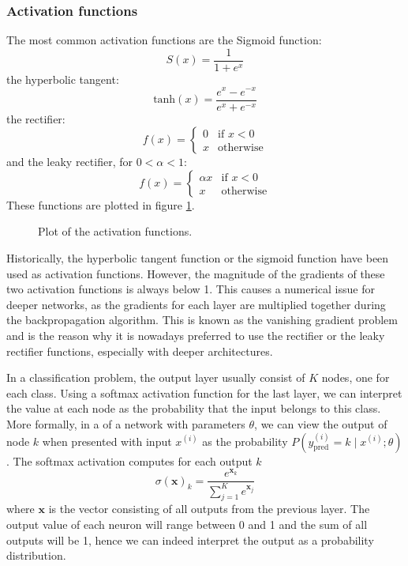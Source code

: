 \documentclass[12pt,a4paper,twoside,openright]{report}
\newlength\figureheight
\newlength\figurewidth
\begin{document}
\subsubsection{Activation functions}
The most common activation functions are the Sigmoid function:
\begin{equation}
S(x) = \frac{1}{1 + e^x}
\end{equation}
the hyperbolic tangent:
\begin{equation}
	\textrm{tanh}(x)=\frac{e^x - e^{-x}}{e^x + e^{-x}}
\end{equation}
the rectifier:
\begin{equation}
\label{eq:linear_rectifier}
	f(x) = 
\begin{cases}
	0 & \text{if } x < 0\\
	x & \text{otherwise}
\end{cases}
\end{equation}
and the leaky rectifier, for $0 < \alpha < 1$:
\begin{equation}
f(x) = 
\begin{cases}
	\alpha x & \text{if } x < 0\\
	x & \text{otherwise}
\end{cases}
\end{equation}
These functions are plotted in figure \ref{fig:activation_functions}. 
\begin{figure}
	\centering 
	\setlength\figureheight{10cm}
	\setlength{}
	
	\caption{Plot of the activation functions.}
	\label{fig:activation_functions}
\end{figure}
Historically, the hyperbolic tangent function or the sigmoid function have been used as activation functions. However, the magnitude of the gradients of these two activation functions is always below 1. This causes a numerical issue for deeper networks, as the gradients for each layer are multiplied together during the backpropagation algorithm. This is known as the vanishing gradient problem \cite{vanishing_gradients} and is the reason why it is nowadays preferred to use the rectifier or the leaky rectifier functions, especially with deeper architectures.

In a classification problem, the output layer usually consist of $K$ nodes, one for each class. Using a softmax activation function for the last layer, we can interpret the value at each node as the probability that the input belongs to this class.  More formally, in a of a network with parameters $\theta$, we can view the output of node $k$ when presented with input $x^{(i)}$ as the probability $P(y_{\text{pred}}^{(i)} = k \mid x^{(i)};\theta)$. The softmax activation computes for each output $k$
\begin{equation}
	\sigma(\mathbf{x})_k = \frac{e^{\mathbf{x}_k}}{\sum_{j=1}^{K}e^{\mathbf{x}_j}}
\end{equation}
where $\mathbf{x}$ is the vector consisting of all outputs from the previous layer. The output value of each neuron will range between 0 and 1 and the sum of all outputs will be 1, hence we can indeed interpret the output as a probability distribution.
\end{document}
